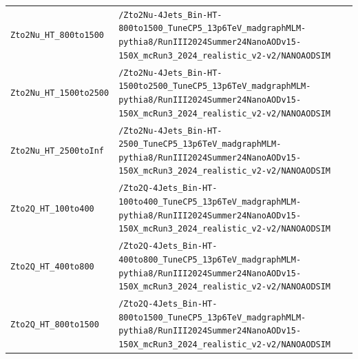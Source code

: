 \begin{longtable}{@{}>{\RaggedRight\arraybackslash}p{} >{\RaggedRight\arraybackslash}p{}@{}}
\addlinespace[2pt]
\texttt{Zto2Nu\_\allowbreak{}HT\_\allowbreak{}800to1500} & \texttt{/\allowbreak{}Zto2Nu-\allowbreak{}4Jets\_\allowbreak{}Bin-\allowbreak{}HT-\allowbreak{}800to1500\_\allowbreak{}TuneCP5\_\allowbreak{}13p6TeV\_\allowbreak{}madgraphMLM-\allowbreak{}pythia8/\allowbreak{}RunIII2024Summer24NanoAODv15-\allowbreak{}150X\_\allowbreak{}mcRun3\_\allowbreak{}2024\_\allowbreak{}realistic\_\allowbreak{}v2-\allowbreak{}v2/\allowbreak{}NANOAODSIM} \\
\addlinespace[2pt]
\texttt{Zto2Nu\_\allowbreak{}HT\_\allowbreak{}1500to2500} & \texttt{/\allowbreak{}Zto2Nu-\allowbreak{}4Jets\_\allowbreak{}Bin-\allowbreak{}HT-\allowbreak{}1500to2500\_\allowbreak{}TuneCP5\_\allowbreak{}13p6TeV\_\allowbreak{}madgraphMLM-\allowbreak{}pythia8/\allowbreak{}RunIII2024Summer24NanoAODv15-\allowbreak{}150X\_\allowbreak{}mcRun3\_\allowbreak{}2024\_\allowbreak{}realistic\_\allowbreak{}v2-\allowbreak{}v2/\allowbreak{}NANOAODSIM} \\
\addlinespace[2pt]
\texttt{Zto2Nu\_\allowbreak{}HT\_\allowbreak{}2500toInf} & \texttt{/\allowbreak{}Zto2Nu-\allowbreak{}4Jets\_\allowbreak{}Bin-\allowbreak{}HT-\allowbreak{}2500\_\allowbreak{}TuneCP5\_\allowbreak{}13p6TeV\_\allowbreak{}madgraphMLM-\allowbreak{}pythia8/\allowbreak{}RunIII2024Summer24NanoAODv15-\allowbreak{}150X\_\allowbreak{}mcRun3\_\allowbreak{}2024\_\allowbreak{}realistic\_\allowbreak{}v2-\allowbreak{}v2/\allowbreak{}NANOAODSIM} \\
\addlinespace[2pt]
\texttt{Zto2Q\_\allowbreak{}HT\_\allowbreak{}100to400} & \texttt{/\allowbreak{}Zto2Q-\allowbreak{}4Jets\_\allowbreak{}Bin-\allowbreak{}HT-\allowbreak{}100to400\_\allowbreak{}TuneCP5\_\allowbreak{}13p6TeV\_\allowbreak{}madgraphMLM-\allowbreak{}pythia8/\allowbreak{}RunIII2024Summer24NanoAODv15-\allowbreak{}150X\_\allowbreak{}mcRun3\_\allowbreak{}2024\_\allowbreak{}realistic\_\allowbreak{}v2-\allowbreak{}v2/\allowbreak{}NANOAODSIM} \\
\addlinespace[2pt]
\texttt{Zto2Q\_\allowbreak{}HT\_\allowbreak{}400to800} & \texttt{/\allowbreak{}Zto2Q-\allowbreak{}4Jets\_\allowbreak{}Bin-\allowbreak{}HT-\allowbreak{}400to800\_\allowbreak{}TuneCP5\_\allowbreak{}13p6TeV\_\allowbreak{}madgraphMLM-\allowbreak{}pythia8/\allowbreak{}RunIII2024Summer24NanoAODv15-\allowbreak{}150X\_\allowbreak{}mcRun3\_\allowbreak{}2024\_\allowbreak{}realistic\_\allowbreak{}v2-\allowbreak{}v2/\allowbreak{}NANOAODSIM} \\
\addlinespace[2pt]
\texttt{Zto2Q\_\allowbreak{}HT\_\allowbreak{}800to1500} & \texttt{/\allowbreak{}Zto2Q-\allowbreak{}4Jets\_\allowbreak{}Bin-\allowbreak{}HT-\allowbreak{}800to1500\_\allowbreak{}TuneCP5\_\allowbreak{}13p6TeV\_\allowbreak{}madgraphMLM-\allowbreak{}pythia8/\allowbreak{}RunIII2024Summer24NanoAODv15-\allowbreak{}150X\_\allowbreak{}mcRun3\_\allowbreak{}2024\_\allowbreak{}realistic\_\allowbreak{}v2-\allowbreak{}v2/\allowbreak{}NANOAODSIM} \\

\end{longtable}
